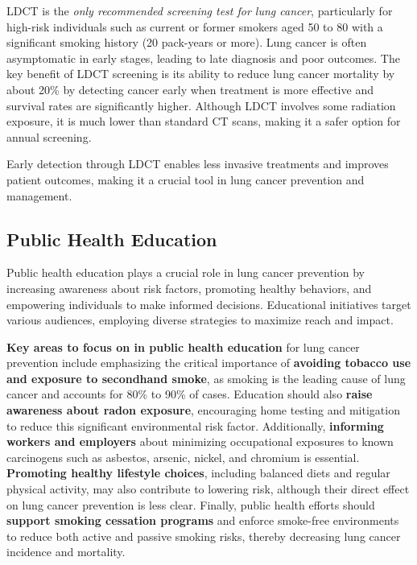 LDCT is the \textit{only recommended screening test for lung cancer}, particularly for high-risk 
individuals such as current or former smokers aged 50 to 80 with a significant smoking history (20 
pack-years or more). Lung cancer is often asymptomatic in early stages, leading to late diagnosis 
and poor outcomes. The key benefit of LDCT screening is its ability to reduce lung cancer mortality 
by about 20\% by detecting cancer early when treatment is more effective and survival rates are 
significantly higher. Although LDCT involves some radiation exposure, it is much lower than standard 
CT scans, making it a safer option for annual screening.\cite{sl2020}

Early detection through LDCT enables less invasive treatments and improves patient outcomes, making 
it a crucial tool in lung cancer prevention and management.

\subsection{Public Health Education}

Public health education plays a crucial role in lung cancer prevention by increasing awareness about 
risk factors, promoting healthy behaviors, and empowering individuals to make informed decisions. 
Educational initiatives target various audiences, employing diverse strategies to maximize reach 
and impact.

\textbf{Key areas to focus on in public health education} for lung cancer prevention include 
emphasizing the critical importance of \textbf{avoiding tobacco use and exposure to secondhand 
smoke}, as smoking is the leading cause of lung cancer and accounts for 80\% to 90\% of cases. 
Education should also \textbf{raise awareness about radon exposure}, encouraging home testing and 
mitigation to reduce this significant environmental risk factor. Additionally, \textbf{informing 
workers and employers} about minimizing occupational exposures to known carcinogens such as 
asbestos, arsenic, nickel, and chromium is essential. \textbf{Promoting healthy lifestyle choices}, 
including balanced diets and regular physical activity, may also contribute to lowering risk, 
although their direct effect on lung cancer prevention is less clear. Finally, public health efforts 
should \textbf{support smoking cessation programs} and enforce smoke-free environments to reduce 
both active and passive smoking risks, thereby decreasing lung cancer incidence and mortality.
\cite{nci2025}

